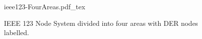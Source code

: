 \documentclass[varwidth]{standalone}
\providecommand{\figpath}{../figures/} %
\providecommand{\figpath}{../../figures/} %
\begin{document}
    \begin{figure}
        \centering
        {ieee123-FourAreas.pdf_tex}
        \caption{IEEE 123 Node System divided into four areas with DER nodes labelled.}
        \label{fig:ieee123-fourareas}
    \end{figure}
\end{document}
